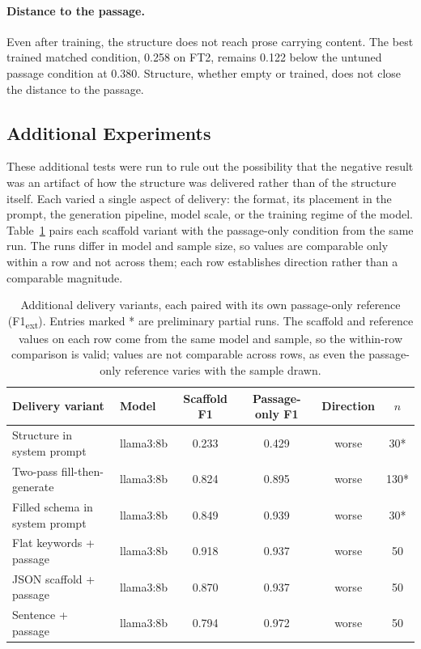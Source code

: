 \documentclass{article}
\begin{document}
\paragraph{Distance to the passage.}
Even after training, the structure does not reach prose carrying content. The best trained matched condition, 0.258 on FT2, remains 0.122 below the untuned passage condition at 0.380. Structure, whether empty or trained, does not close the distance to the passage.

\subsection{Additional Experiments}
\label{sec:exploratory}

These additional tests were run to rule out the possibility that the negative result was an artifact of how the structure was delivered rather than of the structure itself. Each varied a single aspect of delivery: the format, its placement in the prompt, the generation pipeline, model scale, or the training regime of the model. Table~\ref{tab:exploratory} pairs each scaffold variant with the passage-only condition from the same run. The runs differ in model and sample size, so values are comparable only within a row and not across them; each row establishes direction rather than a comparable magnitude.

\begin{table}[h]
\centering
\begin{tabular}{llcccc}
\toprule
Delivery variant & Model & Scaffold F1 & Passage-only F1 & Direction & $n$ \\
\midrule
Structure in system prompt      & llama3:8b   & 0.233 & 0.429 & worse         & 30* \\
Two-pass fill-then-generate      & llama3:8b   & 0.824 & 0.895 & worse         & 130* \\
Filled schema in system prompt   & llama3:8b   & 0.849 & 0.939 & worse         & 30* \\
Flat keywords + passage          & llama3:8b   & 0.918 & 0.937 & worse         & 50 \\
JSON scaffold + passage          & llama3:8b   & 0.870 & 0.937 & worse         & 50 \\
Sentence + passage               & llama3:8b   & 0.794 & 0.972 & worse         & 50 \\
\bottomrule
\end{tabular}
\caption{Additional delivery variants, each paired with its own passage-only reference (F1\textsubscript{ext}). Entries marked * are preliminary partial runs. The scaffold and reference values on each row come from the same model and sample, so the within-row comparison is valid; values are not comparable across rows, as even the passage-only reference varies with the sample drawn.}
\label{tab:exploratory}
\end{table}
\end{document}

